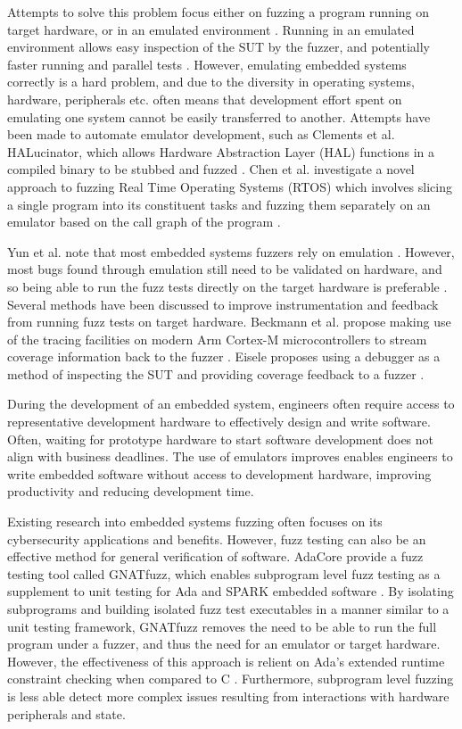 \documentclass[11pt]{article}
\begin{document}
Attempts to solve this problem focus either on fuzzing a program running on
target hardware, or in an emulated environment \citep{Eisele_et_al_2022}.
Running in an emulated environment allows easy inspection of the SUT by the
fuzzer, and potentially faster running and parallel tests
\citep{Eisele_et_al_2022}. However, emulating embedded systems correctly is a
hard problem, and due to the diversity in operating systems, hardware,
peripherals etc. often means that development effort spent on emulating one
system cannot be easily transferred to another. Attempts have been made to
automate emulator development, such as Clements et al. HALucinator, which
allows Hardware Abstraction Layer (HAL) functions in a compiled binary to be
stubbed and fuzzed \citep{Clements_2021}.
Chen et al. investigate a novel approach to fuzzing Real Time Operating Systems
(RTOS) which involves slicing a single program into its constituent tasks and
fuzzing them separately on an emulator based on the call graph of the program
\citep{Chen_2022}.

Yun et al. note that most embedded systems fuzzers rely on emulation
\citep{Yun_2022}. However, most bugs found through emulation still need to be
validated on hardware, and so being able to run the fuzz tests directly on the
target hardware is preferable \citep{Eisele_et_al_2022}. Several methods have
been discussed to improve instrumentation and feedback from running fuzz tests
on target hardware. Beckmann et al. propose making use of the tracing
facilities on modern Arm Cortex-M microcontrollers to stream coverage
information back to the fuzzer \citep{Beckmann_2023}. Eisele proposes using a
debugger as a method of inspecting the SUT and providing coverage feedback to a
fuzzer \citep{Eisele_2022}.

During the development of an embedded system, engineers often require access to
representative development hardware to effectively design and write software.
Often, waiting for prototype hardware to start software development does not
align with business deadlines. The use of emulators improves enables engineers
to write embedded software without access to development hardware, improving
productivity and reducing development time.

Existing research into embedded systems fuzzing often focuses on its
cybersecurity applications and benefits. However, fuzz testing can also be an
effective method for general verification of software. AdaCore provide a fuzz
testing tool called GNATfuzz, which enables subprogram level fuzz testing as a
supplement to unit testing for Ada and SPARK embedded software
\citep{gnatfuzz}. By isolating subprograms and building isolated fuzz test
executables in a manner similar to a unit testing framework, GNATfuzz removes
the need to be able to run the full program under a fuzzer, and thus the need
for an emulator or target hardware. However, the effectiveness of this approach
is relient on Ada's extended runtime constraint checking when compared to C
\citep{gnatfuzz}. Furthermore, subprogram level fuzzing is less able detect
more complex issues resulting from interactions with hardware peripherals and
state.
\end{document}
